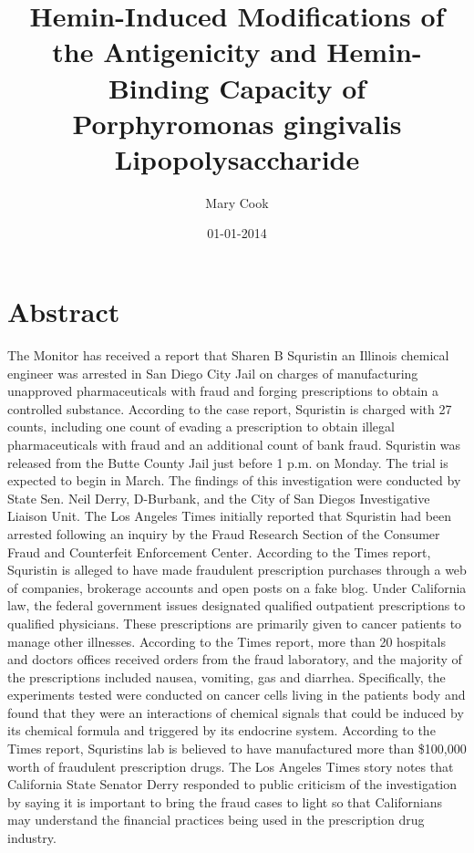 \documentclass{article}%
\title{Hemin{-}Induced Modifications of the Antigenicity and Hemin{-}Binding Capacity of Porphyromonas gingivalis Lipopolysaccharide}%
\author{Mary Cook}%
\affil{National Creative Research Initiatives Center for Nuclear Receptor Signals, Hormone Research Center, School of Biological Sciences and Technology, Chonnam National University, Gwangju, Republic of Korea}%
\date{01{-}01{-}2014}%
\begin{document}
%
\normalsize%
\maketitle%
\section{Abstract}%
\label{sec:Abstract}%
The Monitor has received a report that Sharen B Squristin an Illinois chemical engineer was arrested in San Diego City Jail on charges of manufacturing unapproved pharmaceuticals with fraud and forging prescriptions to obtain a controlled substance.\newline%
According to the case report, Squristin is charged with 27 counts, including one count of evading a prescription to obtain illegal pharmaceuticals with fraud and an additional count of bank fraud. Squristin was released from the Butte County Jail just before 1 p.m. on Monday.\newline%
The trial is expected to begin in March.\newline%
The findings of this investigation were conducted by State Sen. Neil Derry, D{-}Burbank, and the City of San Diegos Investigative Liaison Unit.\newline%
The Los Angeles Times initially reported that Squristin had been arrested following an inquiry by the Fraud Research Section of the Consumer Fraud and Counterfeit Enforcement Center. According to the Times report, Squristin is alleged to have made fraudulent prescription purchases through a web of companies, brokerage accounts and open posts on a fake blog.\newline%
Under California law, the federal government issues designated qualified outpatient prescriptions to qualified physicians. These prescriptions are primarily given to cancer patients to manage other illnesses.\newline%
According to the Times report, more than 20 hospitals and doctors offices received orders from the fraud laboratory, and the majority of the prescriptions included nausea, vomiting, gas and diarrhea.\newline%
Specifically, the experiments tested were conducted on cancer cells living in the patients body and found that they were an interactions of chemical signals that could be induced by its chemical formula and triggered by its endocrine system.\newline%
According to the Times report, Squristins lab is believed to have manufactured more than \$100,000 worth of fraudulent prescription drugs.\newline%
The Los Angeles Times story notes that California State Senator Derry responded to public criticism of the investigation by saying it is important to bring the fraud cases to light so that Californians may understand the financial practices being used in the prescription drug industry.
\end{document}
